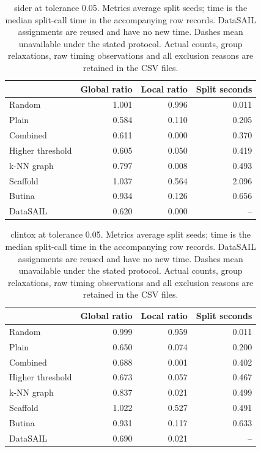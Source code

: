 \begin{table}[htbp]\centering\small
\begin{tabular}{lrrr}
\toprule
 & Global ratio & Local ratio & Split seconds \\
\midrule
Random & 1.001 & 0.996 & 0.011 \\
Plain & 0.584 & 0.110 & 0.205 \\
Combined & 0.611 & 0.000 & 0.370 \\
Higher threshold & 0.605 & 0.050 & 0.419 \\
k-NN graph & 0.797 & 0.008 & 0.493 \\
Scaffold & 1.037 & 0.564 & 2.096 \\
Butina & 0.934 & 0.126 & 0.656 \\
DataSAIL & 0.620 & 0.000 & -- \\
\bottomrule
\end{tabular}

\caption{sider at tolerance 0.05. Metrics average split seeds; time is the median split-call time in the accompanying row records. DataSAIL assignments are reused and have no new time. Dashes mean unavailable under the stated protocol. Actual counts, group relaxations, raw timing observations and all exclusion reasons are retained in the CSV files.}\end{table}
\begin{table}[htbp]\centering\small
\begin{tabular}{lrrr}
\toprule
 & Global ratio & Local ratio & Split seconds \\
\midrule
Random & 0.999 & 0.959 & 0.011 \\
Plain & 0.650 & 0.074 & 0.200 \\
Combined & 0.688 & 0.001 & 0.402 \\
Higher threshold & 0.673 & 0.057 & 0.467 \\
k-NN graph & 0.837 & 0.021 & 0.499 \\
Scaffold & 1.022 & 0.527 & 0.491 \\
Butina & 0.931 & 0.117 & 0.633 \\
DataSAIL & 0.690 & 0.021 & -- \\
\bottomrule
\end{tabular}

\caption{clintox at tolerance 0.05. Metrics average split seeds; time is the median split-call time in the accompanying row records. DataSAIL assignments are reused and have no new time. Dashes mean unavailable under the stated protocol. Actual counts, group relaxations, raw timing observations and all exclusion reasons are retained in the CSV files.}\end{table}
